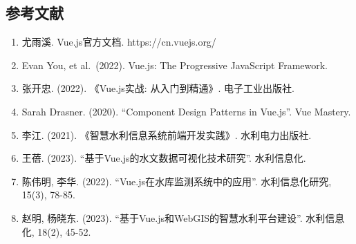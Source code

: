 \subsection{参考文献}\label{ux53c2ux8003ux6587ux732e}

\begin{enumerate}
\def\labelenumi{\arabic{enumi}.}
\tightlist
\item
  尤雨溪. Vue.js官方文档. https://cn.vuejs.org/
\item
  Evan You, et al.~(2022). Vue.js: The Progressive JavaScript Framework.
\item
  张开忠. (2022). 《Vue.js实战: 从入门到精通》. 电子工业出版社.
\item
  Sarah Drasner. (2020). ``Component Design Patterns in Vue.js''. Vue
  Mastery.
\item
  李江. (2021). 《智慧水利信息系统前端开发实践》. 水利电力出版社.
\item
  王蓓. (2023). ``基于Vue.js的水文数据可视化技术研究''. 水利信息化.
\item
  陈伟明, 李华. (2022). ``Vue.js在水库监测系统中的应用''.
  水利信息化研究, 15(3), 78-85.
\item
  赵明, 杨晓东. (2023). ``基于Vue.js和WebGIS的智慧水利平台建设''.
  水利信息化, 18(2), 45-52.
\end{enumerate}
